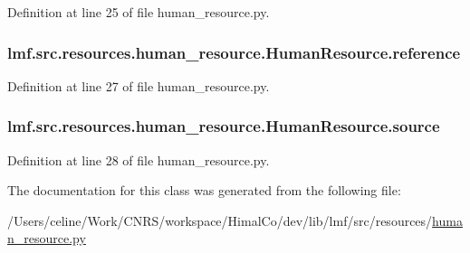 Definition at line 25 of file human\+\_\+resource.\+py.

\hypertarget{classlmf_1_1src_1_1resources_1_1human__resource_1_1_human_resource_ae236a9203ed63c1afe852eb2708e3949}{
\subsubsection[{reference}]{\setlength{\rightskip}{0pt plus 5cm}lmf.\+src.\+resources.\+human\+\_\+resource.\+Human\+Resource.\+reference}}\label{classlmf_1_1src_1_1resources_1_1human__resource_1_1_human_resource_ae236a9203ed63c1afe852eb2708e3949}


Definition at line 27 of file human\+\_\+resource.\+py.

\hypertarget{classlmf_1_1src_1_1resources_1_1human__resource_1_1_human_resource_a2de15de1c117422bb42047d0f56c796a}{
\subsubsection[{source}]{\setlength{\rightskip}{0pt plus 5cm}lmf.\+src.\+resources.\+human\+\_\+resource.\+Human\+Resource.\+source}}\label{classlmf_1_1src_1_1resources_1_1human__resource_1_1_human_resource_a2de15de1c117422bb42047d0f56c796a}


Definition at line 28 of file human\+\_\+resource.\+py.



The documentation for this class was generated from the following file\+:\begin{DoxyCompactItemize}
\item 
/\+Users/celine/\+Work/\+C\+N\+R\+S/workspace/\+Himal\+Co/dev/lib/lmf/src/resources/\hyperlink{human__resource_8py}{human\+\_\+resource.\+py}\end{DoxyCompactItemize}

